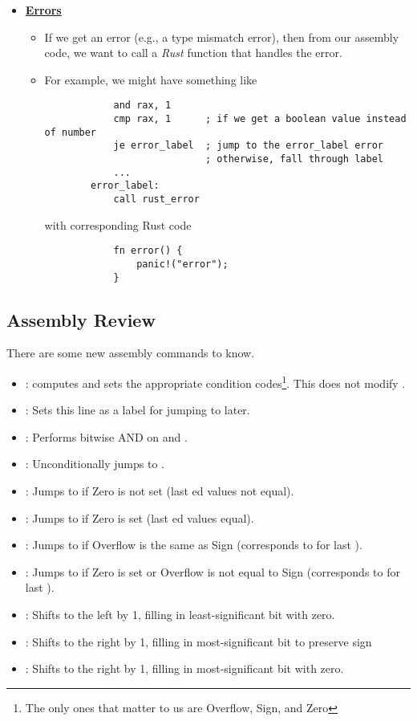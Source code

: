 \documentclass[letterpaper]{article}
\begin{document}
\begin{itemize}
    \item \underline{\textbf{Errors}}
    \begin{itemize}
        \item If we get an error (e.g., a type mismatch error), then from our assembly code, we want to call a \emph{Rust} function that handles the error. 
        \item For example, we might have something like 
        \begin{verbatim}
            and rax, 1 
            cmp rax, 1      ; if we get a boolean value instead of number
            je error_label  ; jump to the error_label error 
                            ; otherwise, fall through label
            ...
        error_label: 
            call rust_error\end{verbatim}
        with corresponding Rust code 
        \begin{verbatim}
            fn error() {
                panic!("error");
            }\end{verbatim}
    \end{itemize}
\end{itemize}


\subsection{Assembly Review}
There are some new assembly commands to know.
\begin{itemize}
    \item {}: computes  and sets the appropriate condition codes\footnote{The only ones that matter to us are Overflow, Sign, and Zero}. This does not modify .
    \item {}: Sets this line as a label for jumping to later. 
    \item {}: Performs bitwise AND on  and . 
    \item {}: Unconditionally jumps to .
    \item {}: Jumps to  if Zero is not set (last ed values not equal).
    \item {}: Jumps to  if Zero is set (last ed values equal).
    \item {}: Jumps to  if Overflow is the same as Sign (corresponds to \code{>=} for last ).
    \item {}: Jumps to  if Zero is set or Overflow is not equal to Sign (corresponds to \code{<=} for last ).
    \item {}: Shifts  to the left by 1, filling in least-significant bit with zero.
    \item {}: Shifts  to the right by 1, filling in most-significant bit to preserve sign
    \item {}: Shifts  to the right by 1, filling in most-significant bit with zero.
\end{itemize}
\end{document}
